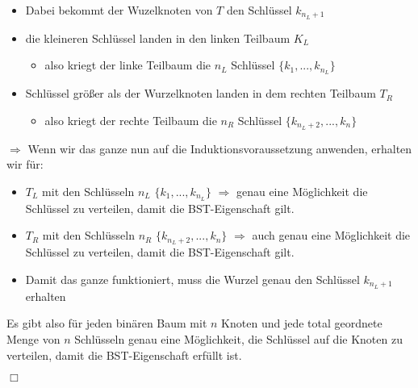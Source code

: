 \begin{itemize}
	\item Dabei bekommt der Wuzelknoten von $T$ den Schlüssel $k_{n_{L}+1}$
	\item die kleineren Schlüssel landen in den linken Teilbaum $K_{L}$
	\begin{itemize}
		\item also kriegt der linke Teilbaum die $n_{L}$ Schlüssel $\{k_{1},...,k_{n_{L}}\}$
	\end{itemize}
	\item Schlüssel größer als der Wurzelknoten landen in dem rechten Teilbaum $T_{R}$
	\begin{itemize}
		\item also kriegt der rechte Teilbaum die $n_{R}$ Schlüssel $\{k_{n_{L}+2},...,k_{n}\}$
	\end{itemize}
\end{itemize}

$\Rightarrow$ Wenn wir das ganze nun auf die Induktionsvoraussetzung anwenden, erhalten wir für:
\begin{itemize}
	\item $T_{L}$ mit den Schlüsseln $n_{L}$ $\{k_{1},...,k_{n_{L}}\}$ $\Rightarrow$ genau eine Möglichkeit die Schlüssel zu verteilen, damit die BST-Eigenschaft gilt.
	\item $T_{R}$ mit den Schlüsseln $n_{R}$ $\{k_{n_{L}+2},...,k_{n}\}$ $\Rightarrow$ auch genau eine Möglichkeit die Schlüssel zu verteilen, damit die BST-Eigenschaft gilt.
	\item Damit das ganze funktioniert, muss die Wurzel genau den Schlüssel $k_{n_{L}+1}$ erhalten
\end{itemize}

Es gibt also für jeden binären Baum mit $n$ Knoten und jede total geordnete Menge von $n$ Schlüsseln genau eine Möglichkeit, die Schlüssel auf die Knoten zu verteilen, damit die BST-Eigenschaft erfüllt ist.
\begin{flushright}
$\Box$
\end{flushright}





 







